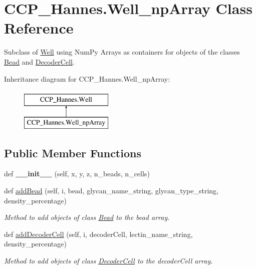 \hypertarget{class_c_c_p___hannes_1_1_well__np_array}{}\section{C\+C\+P\+\_\+\+Hannes.\+Well\+\_\+np\+Array Class Reference}
\label{class_c_c_p___hannes_1_1_well__np_array}


Subclass of \mbox{\hyperlink{class_c_c_p___hannes_1_1_well}{Well}} using Num\+Py Arrays as containers for objects of the classes \mbox{\hyperlink{class_c_c_p___hannes_1_1_bead}{Bead}} and \mbox{\hyperlink{class_c_c_p___hannes_1_1_decoder_cell}{Decoder\+Cell}}.  


Inheritance diagram for C\+C\+P\+\_\+\+Hannes.\+Well\+\_\+np\+Array\+:\begin{figure}[H]
\begin{center}
\leavevmode
\includegraphics[height=2.000000cm]{class_c_c_p___hannes_1_1_well__np_array}
\end{center}
\end{figure}
\subsection*{Public Member Functions}
\begin{DoxyCompactItemize}
\item 
\mbox{\label{class_c_c_p___hannes_1_1_well__np_array_ae9dcb8374add330e7be7bc24cf67b028}} 
def {\bfseries \+\_\+\+\_\+init\+\_\+\+\_\+} (self, x, y, z, n\+\_\+beads, n\+\_\+cells)
\item 
def \mbox{\hyperlink{class_c_c_p___hannes_1_1_well__np_array_a567ac8f93ed94e89cfe48ebbcce71c3f}{add\+Bead}} (self, i, bead, glycan\+\_\+name\+\_\+string, glycan\+\_\+type\+\_\+string, density\+\_\+percentage)
\begin{DoxyCompactList}\small\item\em Method to add objects of class \mbox{\hyperlink{class_c_c_p___hannes_1_1_bead}{Bead}} to the bead array. \end{DoxyCompactList}\item 
def \mbox{\hyperlink{class_c_c_p___hannes_1_1_well__np_array_a7a093a679a69478c385bea283f66c826}{add\+Decoder\+Cell}} (self, i, decoder\+Cell, lectin\+\_\+name\+\_\+string, density\+\_\+percentage)
\begin{DoxyCompactList}\small\item\em Method to add objects of class \mbox{\hyperlink{class_c_c_p___hannes_1_1_decoder_cell}{Decoder\+Cell}} to the decoder\+Cell array. \end{DoxyCompactList}\end{DoxyCompactItemize}

